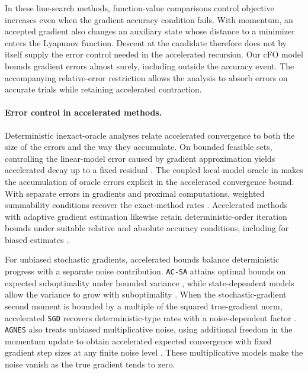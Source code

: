 \documentclass{article}
\begin{document}
In these line-search methods, function-value comparisons control
objective increases even when the gradient accuracy condition fails.
With momentum, an accepted gradient also changes an auxiliary state
whose distance to a minimizer enters the Lyapunov function. Descent
at the candidate therefore does not by itself supply the error control
needed in the accelerated recursion. Our cFO model bounds gradient errors almost surely, including
outside the accuracy event. The accompanying relative-error
restriction allows the analysis to absorb errors on accurate trials
while retaining accelerated contraction.

\paragraph{Error control in accelerated methods.}
Deterministic inexact-oracle analyses relate accelerated convergence
to both the size of the errors and the way they accumulate.
On bounded feasible sets, controlling the linear-model error caused
by gradient approximation yields accelerated decay up to a fixed
residual \cite{d2008smooth}.
The coupled local-model oracle in \cite{devolder2014first} makes the accumulation of
oracle errors explicit in the accelerated convergence bound. With
separate errors in gradients and proximal computations, weighted
summability conditions recover the exact-method rates \cite{Inexactprox2011}.
Accelerated methods with adaptive gradient estimation likewise retain
deterministic-order iteration bounds under suitable relative and
absolute accuracy conditions, including for biased estimates \cite{bollapragada2025convergencecomplexityproximalgradient}.

For unbiased stochastic gradients, accelerated bounds balance
deterministic progress with a separate noise contribution. \texttt{AC-SA}
attains optimal bounds on expected suboptimality under bounded
variance \cite{lan2012optimal}, while state-dependent models allow the variance
to grow with suboptimality \cite{ilandarideva2025state}. When the stochastic-gradient
second moment is bounded by a multiple of the squared true-gradient
norm, accelerated \texttt{SGD} recovers deterministic-type rates with a
noise-dependent factor \cite{Vaswani2019a}. \texttt{AGNES} also treats unbiased
multiplicative noise, using additional freedom in the momentum update
to obtain accelerated expected convergence with fixed gradient step
sizes at any finite noise level \cite{gupta2024nesterovaccelerationdespitenoisy}. These multiplicative models
make the noise vanish as the true gradient tends to zero.
\end{document}
